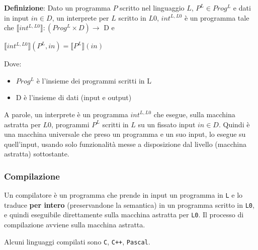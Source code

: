 \documentclass[12pt,a4paper]{article}
\begin{document}
\clearpage

\textbf{Definizione}: Dato un programma $P$ scritto nel linguaggio $L$, $P^L \in Prog^L$ e dati in input $in \in D$, un interprete per $L$ scritto in $L0$, $int^{L,L0}$ è un programma tale che $\llbracket int ^{L,L0} \rrbracket : (Prog^L \times D) \longrightarrow$ D e

\begin{center}
\texttt{$ \llbracket int ^{L,L0} \rrbracket (P^L,in) = \llbracket P^L \rrbracket (in)$ }
\end{center}

Dove:
\begin{itemize}
\item $Prog^L$ è l'insieme dei programmi scritti in L
\item D è l'insieme di dati (input e output)
\end{itemize}

A parole, un interprete è un programma $int ^{L,L0}$ che esegue, sulla
macchina astratta per $L0$, programmi $P^L$ scritti in $L$ su un fissato input $in\in D$. Quindi è una macchina universale che preso un programma e un suo input, lo esegue su quell’input, usando solo funzionalità messe a disposizione dal livello (macchina astratta) sottostante.
\subsubsection{Compilazione}
Un compilatore è un programma che prende in input un programma in \texttt{L} e lo traduce \textbf{per intero} (preservandone la semantica) in un programma scritto in \texttt{L0}, e quindi eseguibile direttamente sulla macchina astratta per \texttt{L0}. Il processo di compilazione avviene sulla macchina astratta.

Alcuni linguaggi compilati sono \texttt{C}, \texttt{C++}, \texttt{Pascal}.
\end{document}
